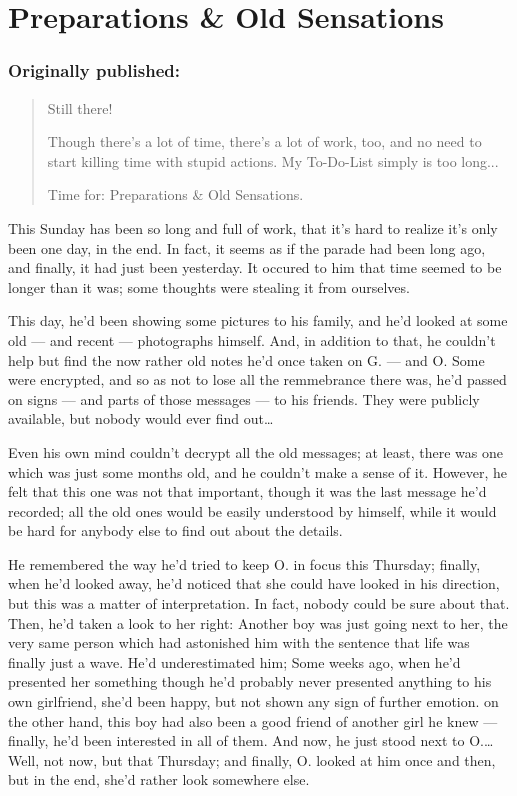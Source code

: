 \chapter{Preparations \& Old Sensations}
\label{cha:preparations-and-old-sensations}
\subsection*{Originally published: }
\begin{quote}
Still there!

Though there's a lot of time, there's a lot of work, too, and no need to start killing time with stupid actions. My To-Do-List simply is too long...

Time for: Preparations \& Old Sensations.
\end{quote}

This Sunday has been so long and full of work, that it's hard to realize it's only been one day, in the end. In fact, it seems as if the parade had been long ago, and finally, it had just been yesterday. It occured to him that time seemed to be longer than it was; some thoughts were stealing it from ourselves.

This day, he'd been showing some pictures to his family, and he'd looked at some old --- and recent --- photographs himself. And, in addition to that, he couldn't help but find the now rather old notes he'd once taken on G. --- and O. Some were encrypted, and so as not to lose all the remmebrance there was, he'd passed on signs --- and parts of those messages --- to his friends. They were publicly available, but nobody would ever find out\dots{}

Even his own mind couldn't decrypt all the old messages; at least, there was one which was just some months old, and he couldn't make a sense of it. However, he felt that this one was not that important, though it was the last message he'd recorded; all the old ones would be easily understood by himself, while it would be hard for anybody else to find out about the details.

He remembered the way he'd tried to keep O. in focus this Thursday; finally, when he'd looked away, he'd noticed that she could have looked in his direction, but this was a matter of interpretation. In fact, nobody could be sure about that. Then, he'd taken a look to her right: Another boy was just going next to her, the very same person which had astonished him with the sentence that life was finally just a wave. He'd underestimated him; Some weeks ago, when he'd presented her something though he'd probably never presented anything to his own girlfriend, she'd been happy, but not shown any sign of further emotion. on the other hand, this boy had also been a good friend of another girl he knew --- finally, he'd been interested in all of them. And now, he just stood next to O.\dots{}
Well, not now, but that Thursday; and finally, O. looked at him once and then, but in the end, she'd rather look somewhere else.

